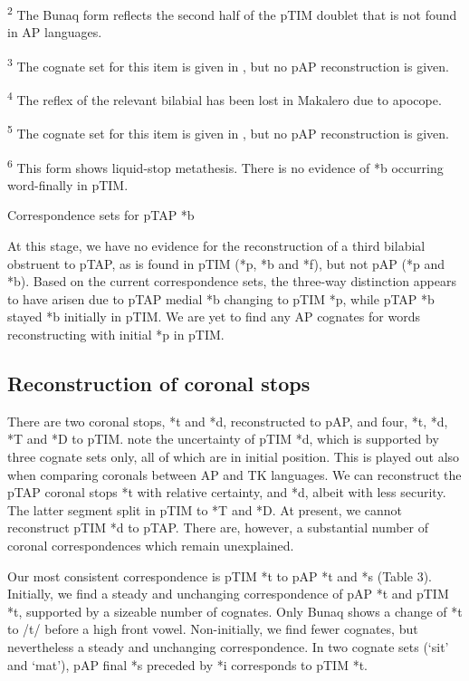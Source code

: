 \begin{sidewaystable}
\begin{flushleft}
\textsuperscript{2} The Bunaq form reflects the second half of the pTIM doublet that is not found in AP languages.

\textsuperscript{3} The cognate set for this item is given in \citet{HoltonEtAl2012}, but no pAP reconstruction is given.

\textsuperscript{4} The reflex of the relevant bilabial has been lost in Makalero due to apocope.

\textsuperscript{5} The cognate set for this item is given in \citet{HoltonEtAl2012}, but no pAP reconstruction is given.

\textsuperscript{6} This form shows liquid-stop metathesis. There is no evidence of *b occurring word-finally in pTIM.
\end{flushleft}
\caption{Correspondence sets for pTAP *b}

\end{sidewaystable}



At this stage, we have no evidence for the reconstruction of a third bilabial obstruent to pTAP, as is found in pTIM (*p, *b and *f), but not pAP (*p and *b). Based on the current correspondence sets, the three-way distinction appears to have arisen due to pTAP medial *b changing to pTIM *p, while pTAP *b stayed *b initially in pTIM. We are yet to find any AP cognates for words reconstructing with initial *p in pTIM.

\subsection{Reconstruction of coronal stops}
There are two coronal stops, *t and *d, reconstructed to pAP, and four, *t, *d, *T and *D to pTIM. \citet{SchapperEtAl2012} note the uncertainty of pTIM *d, which is supported by three cognate sets only, all of which are in initial position. This is played out also when comparing coronals between AP and TK languages. We can reconstruct the pTAP coronal stops *t with relative certainty, and *d, albeit with less security. The latter segment split in pTIM to *T and *D. At present, we cannot reconstruct pTIM *d to pTAP. There are, however, a substantial number of coronal correspondences which remain unexplained.

Our most consistent correspondence is pTIM *t to pAP *t and *s (Table 3). Initially, we find a steady and unchanging correspondence of pAP *t and pTIM *t, supported by a sizeable number of cognates. Only Bunaq shows a change of *t to /t{\textesh}/ before a high front vowel. Non-initially, we find fewer cognates, but nevertheless a steady and unchanging correspondence. In two cognate sets (`sit' and `mat'), pAP final *s preceded by *i corresponds to pTIM *t.


